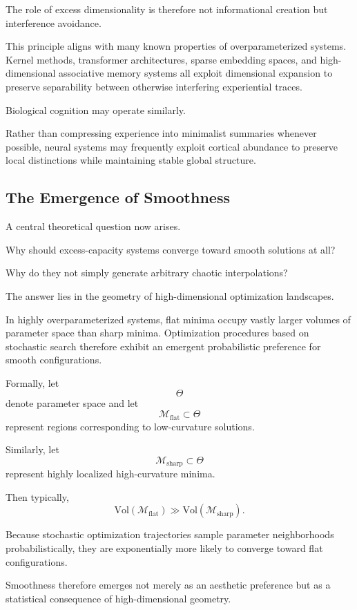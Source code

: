 \documentclass[12pt,a4paper]{article}
\begin{document}
The role of excess dimensionality is therefore not informational creation but interference avoidance.

This principle aligns with many known properties of overparameterized systems. Kernel methods, transformer architectures, sparse embedding spaces, and high-dimensional associative memory systems all exploit dimensional expansion to preserve separability between otherwise interfering experiential traces.

Biological cognition may operate similarly.

Rather than compressing experience into minimalist summaries whenever possible, neural systems may frequently exploit cortical abundance to preserve local distinctions while maintaining stable global structure.

\subsection{The Emergence of Smoothness}

A central theoretical question now arises.

Why should excess-capacity systems converge toward smooth solutions at all?

Why do they not simply generate arbitrary chaotic interpolations?

The answer lies in the geometry of high-dimensional optimization landscapes.

In highly overparameterized systems, flat minima occupy vastly larger volumes of parameter space than sharp minima. Optimization procedures based on stochastic search therefore exhibit an emergent probabilistic preference for smooth configurations.

Formally, let
\[
\Theta
\]
denote parameter space and let
\[
\mathcal{M}_{\text{flat}}
\subset \Theta
\]
represent regions corresponding to low-curvature solutions.

Similarly, let
\[
\mathcal{M}_{\text{sharp}}
\subset \Theta
\]
represent highly localized high-curvature minima.

Then typically,
\[
\text{Vol}(\mathcal{M}_{\text{flat}})
\gg
\text{Vol}(\mathcal{M}_{\text{sharp}}).
\]

Because stochastic optimization trajectories sample parameter neighborhoods probabilistically, they are exponentially more likely to converge toward flat configurations.

Smoothness therefore emerges not merely as an aesthetic preference but as a statistical consequence of high-dimensional geometry.
\end{document}
